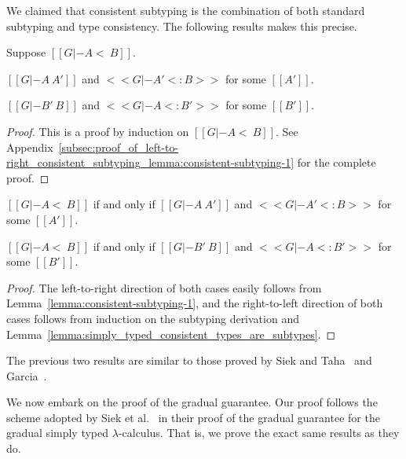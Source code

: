 We claimed that consistent subtyping is the combination of both
standard subtyping and type consistency. The following results makes
this precise. 
\begin{lemma}
  \label{lemma:consistent-subtyping-1}
  Suppose $[[G |- A <~ B]]$.
  \begin{enumR}
    \item $[[G |- A ~ A']]$ and $<<G |- A' <: B>>$ for some $[[A']]$.
    \item $[[G |- B' ~ B]]$ and $<<G |- A <: B'>>$ for some $[[B']]$.
  \end{enumR}   
\end{lemma}
\begin{proof}
  This is a proof by induction on $[[G |- A <~ B]]$.  See
  Appendix~\ref{subsec:proof_of_left-to-right_consistent_subtyping_lemma:consistent-subtyping-1}
  for the complete proof.
\end{proof}
\begin{corollary}
  \label{corollary:consistent_subtyping}
  \begin{enumR}
  \item $[[G |- A <~ B]]$ if and only if $[[G |- A ~ A']]$ and $<<G |- A' <: B>>$ for some $[[A']]$.
  \item $[[G |- A <~ B]]$ if and only if $[[G |- B' ~ B]]$ and $<<G |- A <: B'>>$ for some $[[B']]$.
  \end{enumR}
\end{corollary}
\begin{proof}
  The left-to-right direction of both cases easily follows from
  Lemma~\ref{lemma:consistent-subtyping-1}, and the right-to-left
  direction of both cases follows from induction on the subtyping
  derivation and Lemma~\ref{lemma:simply_typed_consistent_types_are_subtypes}.
\end{proof}
The previous two results are similar to those proved by Siek and
Taha~\cite{Siek:2007} and Garcia~\cite{Garcia:2016}.

We now embark on the proof of the gradual guarantee.  Our proof
follows the scheme adopted by Siek et al.~\cite{Siek:2015} in their
proof of the gradual guarantee for the gradual simply typed
$\lambda$-calculus.  That is, we prove the exact same results as they
do.  

